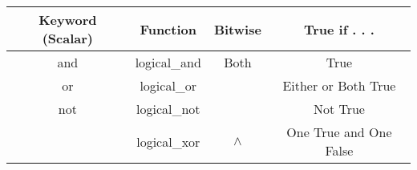\documentclass[KSmain.tex]{subfiles}
\begin{document}
\begin{tabular}{|c|c|c|c|}
	\hline Keyword (Scalar) & Function & Bitwise & True if . . . \\ \hline
	and & logical\_and & Both & True \\ \hline
	or  & logical\_or & &Either or Both True \\ \hline
	not & logical\_not & ~ & Not True \\ \hline
	& logical\_xor & $\wedge$ & One True and One False \\ \hline
\end{tabular} 
\end{document}
